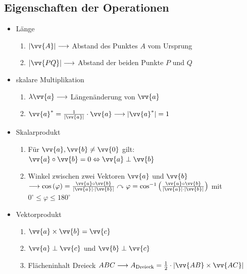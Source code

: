 \subsection{Eigenschaften der Operationen}
\begin{itemize}
\item Länge\\
\begin{enumerate}
\item $|\vv{A}| \longrightarrow$ Abstand des Punktes $A$ vom Ursprung\\
\item $|\vv{PQ}| \longrightarrow$ Abstand der beiden Punkte $P$ und $Q$
\end{enumerate}
\item skalare Multiplikation\\
\begin{enumerate}
\item $\lambda \vv{a} \longrightarrow$ Längenänderung von $\vv{a}$\\
\item $\vv{a}^{\ast} = \frac{1}{|\vv{a}|} \cdot \vv{a} \longrightarrow |\vv{a}^{\ast}| = 1$
\end{enumerate}
\item Skalarprodukt\\
\begin{enumerate}
\item Für $\vv{a}, \vv{b} \neq \vv{0}$ gilt: $\vv{a}\circ \vv{b} = 0 \Leftrightarrow \vv{a}\perp \vv{b}$\\
\item Winkel zwischen zwei Vektoren $\vv{a}$ und $\vv{b}$\\ $\longrightarrow \cos{(\varphi)} = \frac{\vv{a} \circ \vv{b}}{|\vv{a}| \cdot |\vv{b}|} \curvearrowright \varphi = \cos^{-1}{\left(\frac{\vv{a} \circ \vv{b}}{|\vv{a}| \cdot |\vv{b}|}\right)}$ mit $0^\circ \leq \varphi \leq 180^\circ$
\end{enumerate}
\item Vektorprodukt\\
\begin{enumerate}
\item $\vv{a} \times \vv{b} = \vv{c}$\\
\item $\vv{a} \perp \vv{c}$ und $\vv{b} \perp \vv{c}$ \\
\item Flächeninhalt Dreieck $ABC \longrightarrow A_{\text{Dreieck}} = \frac{1}{2} \cdot | \vv{AB}\times \vv{AC}|$\\

\end{enumerate}
\end{itemize}
